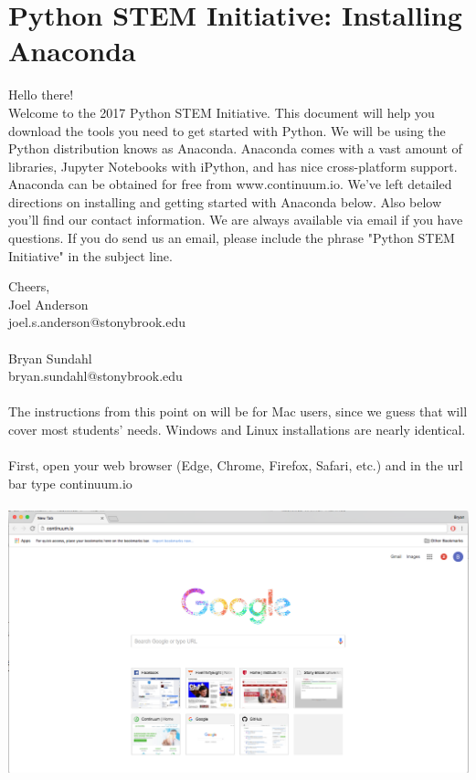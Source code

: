 \documentclass[]{article}
\begin{document}
\section*{Python STEM Initiative: Installing Anaconda}
Hello there! \\

Welcome to the 2017 Python STEM Initiative. This document will help you download the tools you need to get started with Python. We will be using the Python distribution knows as Anaconda. Anaconda comes with a vast amount of libraries, Jupyter Notebooks with iPython, and has nice cross-platform support. Anaconda can be obtained for free from www.continuum.io. We've left detailed directions on installing and getting started with Anaconda below. Also below you'll find our contact information. We are always available via email if you have questions. If you do send us an email, please include the phrase "Python STEM Initiative" in the subject line.

Cheers, \\

Joel Anderson \\
joel.s.anderson@stonybrook.edu\\ \\

Bryan Sundahl \\
bryan.sundahl@stonybrook.edu

\paragraph{}
The instructions from this point on will be for Mac users, since we guess that will cover most students' needs. Windows and Linux installations are nearly identical.
\paragraph{}
First, open your web browser (Edge, Chrome, Firefox, Safari, etc.) and in the url bar type continuum.io
\paragraph{}
\begin{centering}
    \centerline{\includegraphics[scale=0.35]{Screenshot_1.png}}
\end{centering}
\end{document}
